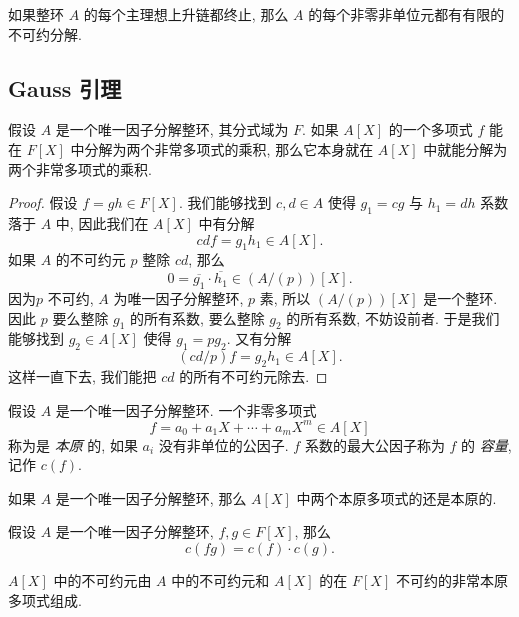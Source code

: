 \begin{proposition}
  如果整环 \( A \) 的每个主理想上升链都终止, 那么 \( A \)
  的每个非零非单位元都有有限的不可约分解.
\end{proposition}

\subsection{Gauss 引理}

\begin{proposition}
  假设 \( A \) 是一个唯一因子分解整环, 其分式域为 \( F \). 如果 \( A[X] \)
  的一个多项式 \( f \) 能在 \( F[X] \) 中分解为两个非常多项式的乘积,
  那么它本身就在 \( A[X] \) 中就能分解为两个非常多项式的乘积.
\end{proposition}
\begin{proof}
  假设 \( f = gh \in F[X] \). 我们能够找到 \( c, d \in A  \) 使得 \( g_1 = cg \)
  与 \( h_1 = dh \) 系数落于 \( A \) 中, 因此我们在 \( A[X] \) 中有分解
  \[
    cd f = g_1 h_1 \in A[X].
  \]
  如果 \( A \) 的不可约元 \( p \) 整除 \( cd \), 那么
  \[
    0 = \overline{g_1} \cdot \overline{h_1} \in (A / (p))[X].
  \]
  因为\( p \) 不可约, \( A \) 为唯一因子分解整环, \( p \) 素, 所以 \( (A /
  (p))[X] \) 是一个整环. 因此 \( p \) 要么整除 \( g_1 \) 的所有系数, 要么整除 \(
  g_2 \) 的所有系数, 不妨设前者. 于是我们能够找到 \( g_2 \in A[X] \) 使得 \( g_1
  = pg_2 \). 又有分解
  \[
    (cd / p)f = g_2 h_1 \in A[X].
  \]
  这样一直下去, 我们能把 \( cd \) 的所有不可约元除去.
\end{proof}

假设 \( A \) 是一个唯一因子分解整环. 一个非零多项式
\[
  f = a_0 + a_1 X + \cdots + a_m X^m \in A[X]
\]
称为是 \emph{本原} 的, 如果 \( a_i \) 没有非单位的公因子.
\( f \) 系数的最大公因子称为 \( f \) 的 \emph{容量}, 记作 \( c(f) \).

\begin{proposition}
  如果 \( A \) 是一个唯一因子分解整环, 那么 \( A[X] \)
  中两个本原多项式的还是本原的.
\end{proposition}

\begin{proposition}
  假设 \( A \) 是一个唯一因子分解整环, \( f, g \in F[X] \), 那么
  \[
    c(fg) = c(f) \cdot c(g).
  \]
\end{proposition}

\begin{corollary}
  \( A[X] \) 中的不可约元由  \( A \) 中的不可约元和 \( A[X] \)
  的在 \( F[X] \) 不可约的非常本原多项式组成.
\end{corollary}

